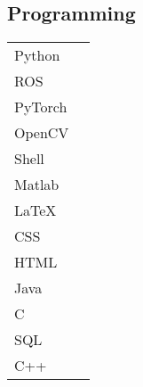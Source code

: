 \documentclass[]{resume}
\begin{document}
\begin{minipage}[t]{0.33\textwidth}
\begin{minipage}[t]{0.90\textwidth}
		\subsection{Programming}
		\vspace{3pt}
		\begin{tabular}{@{}p{65pt}r}
			Python  & \textbullet{}\textbullet{}\textbullet{}\textbullet{}\textbullet{} \\
			ROS     & \textbullet{}\textbullet{}\textbullet{}\textbullet{}              \\
			PyTorch & \textbullet{}\textbullet{}\textbullet{}\textbullet{}              \\
			OpenCV  & \textbullet{}\textbullet{}\textbullet{}\textbullet{}              \\
			Shell   & \textbullet{}\textbullet{}\textbullet{}\textbullet{}              \\
			Matlab  & \textbullet{}\textbullet{}\textbullet{}\textbullet{}              \\
			LaTeX   & \textbullet{}\textbullet{}\textbullet{}\textbullet{}              \\
			CSS     & \textbullet{}\textbullet{}\textbullet{}\textbullet{}              \\
			HTML    & \textbullet{}\textbullet{}\textbullet{}\textbullet{}              \\
			Java    & \textbullet{}\textbullet{}\textbullet{}                           \\
			C       & \textbullet{}\textbullet{}                                        \\
			SQL     & \textbullet{}\textbullet{}                                        \\
			C++     & \textbullet{}                                                     \\
		\end{tabular}




	\end{minipage}
\end{minipage}
\hfill
\end{document}
